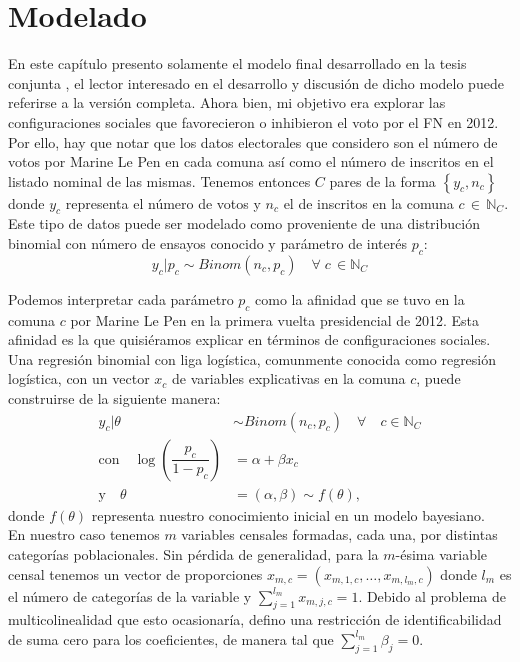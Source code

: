 \chapter{Modelado}

En este capítulo presento solamente el modelo final desarrollado en la tesis conjunta \parencite{TesisAct}, el lector interesado en el desarrollo y discusión de dicho modelo puede referirse a la versión completa. Ahora bien, mi objetivo era explorar las configuraciones sociales que favorecieron o inhibieron el voto por el FN en 2012. Por ello, hay que notar que los datos electorales que considero son el número de votos por Marine Le Pen en cada comuna así como el número de inscritos en el listado nominal de las mismas. Tenemos entonces $C$ pares de la forma $\left\lbrace y_c, n_c \right\rbrace$ donde $y_c$ representa el número de votos y $n_c$ el de inscritos en la comuna $c \,\in\,\mathbb{N}_C$. Este tipo de datos puede ser modelado como proveniente de una distribución binomial con número de ensayos conocido y parámetro de interés $p_c$: 
\begin{equation*}
y_c|p_c \sim Binom(n_c, p_c) \quad \forall \; c \, \in \mathbb{N}_C
\end{equation*} 

Podemos interpretar cada parámetro $p_c$ como la afinidad que se tuvo en la comuna $c$ por Marine Le Pen en la primera vuelta presidencial de 2012. Esta afinidad es la que quisiéramos explicar en términos de configuraciones sociales.\\

Una regresión binomial con liga logística, comunmente conocida como regresión logística, con un vector $x_c$ de variables explicativas en la comuna $c$, puede construirse de la siguiente manera: 
\begin{align*}
y_c|\theta & \sim Binom(n_c,p_c) \quad \forall \quad c \in \mathbb{N}_C \\
\text{con} \quad \log\left(\dfrac{p_c}{1-p_c}\right) &= \alpha + \beta x_c \nonumber \\
\text{y} \quad \theta &= (\alpha,\beta) \sim f(\theta),
\end{align*}
donde $f(\theta)$ representa nuestro conocimiento inicial en un modelo bayesiano.\\ 

En nuestro caso tenemos $m$ variables censales formadas, cada una, por distintas categorías poblacionales. Sin pérdida de generalidad, para la $m$-ésima variable censal tenemos un vector de proporciones $x_{m,c}=(x_{m,1,c},\dots,x_{m,l_m,c})$ donde $l_m$ es el número de categorías de la variable y $\sum\limits_{j=1}^{l_m} x_{m,j,c}=1$. Debido al problema de multicolinealidad que esto ocasionaría, defino una restricción de identificabilidad de suma cero para los coeficientes, de manera tal que $\sum\limits_{j=1}^{l_m}\beta_j=0$.\\

